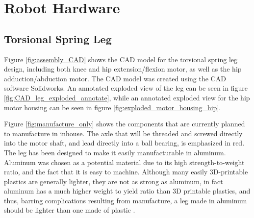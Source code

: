 \section{Robot Hardware}
\label{sec:robot_hardware}

\subsection{Torsional Spring Leg}
\label{sec:torsional_spring_leg}

Figure \ref{fig:assembly_CAD} shows the CAD model for the torsional spring leg design, including both knee and hip extension/flexion motor, as well as the hip adduction/abduction motor. The CAD model was created using the CAD software Solidworks. An annotated exploded view of the leg can be seen in figure \ref{fig:CAD_leg_exploded_annotate}, while an annotated exploded view for the hip motor housing can be seen in figure \ref{fig:exploded_motor_housing_hip}. 

Figure \ref{fig:manufacture_only} shows the components that are currently planned to manufacture in inhouse. The axle that will be threaded and screwed directly into the motor shaft, and lead directly into a ball bearing, is emphasized in red. The leg has been designed to make it easily manufacturable in aluminum. Aluminum was chosen as a potential material due to its high strength-to-weight ratio, and the fact that it is easy to machine. Although many easily 3D-printable plastics are generally lighter, they are not as strong as aluminum, in fact aluminum has a much higher weight to yield ratio than 3D printable plastics, and thus, barring complications resulting from manufacture, a leg made in aluminum should be lighter than one made of plastic \cite{Aluminum} \cite{PLA}. 

